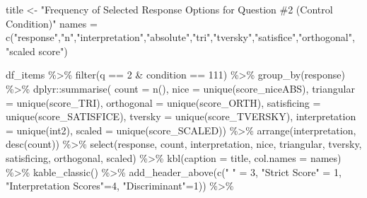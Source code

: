 \documentclass[
  letterpaper,
  DIV=11,
  numbers=noendperiod]{scrreprt}
\newenvironment{Shaded}{\begin{snugshade}}{\end{snugshade}}
\newcommand{\AttributeTok}[1]{\textcolor[rgb]{0.40,0.45,0.13}{#1}}
\newcommand{\DecValTok}[1]{\textcolor[rgb]{0.68,0.00,0.00}{#1}}
\newcommand{\FunctionTok}[1]{\textcolor[rgb]{0.28,0.35,0.67}{#1}}
\newcommand{\NormalTok}[1]{\textcolor[rgb]{0.00,0.23,0.31}{#1}}
\newcommand{\OtherTok}[1]{\textcolor[rgb]{0.00,0.23,0.31}{#1}}
\newcommand{\SpecialCharTok}[1]{\textcolor[rgb]{0.37,0.37,0.37}{#1}}
\newcommand{\StringTok}[1]{\textcolor[rgb]{0.13,0.47,0.30}{#1}}
\begin{document}
\begin{Shaded}
\begin{Highlighting}[]
\NormalTok{title }\OtherTok{\textless{}{-}} \StringTok{"Frequency of Selected Response Options for Question \#2 (Control Condition)"}
\NormalTok{names }\OtherTok{=} \FunctionTok{c}\NormalTok{(}\StringTok{"response"}\NormalTok{,}\StringTok{"n"}\NormalTok{,}\StringTok{"interpretation"}\NormalTok{,}\StringTok{"absolute"}\NormalTok{,}\StringTok{"tri"}\NormalTok{,}\StringTok{"tversky"}\NormalTok{,}\StringTok{"satisfice"}\NormalTok{,}\StringTok{"orthogonal"}\NormalTok{, }\StringTok{"scaled score"}\NormalTok{)}

\NormalTok{df\_items }\SpecialCharTok{\%\textgreater{}\%} \FunctionTok{filter}\NormalTok{(q }\SpecialCharTok{==} \DecValTok{2} \SpecialCharTok{\&}\NormalTok{ condition }\SpecialCharTok{==} \DecValTok{111}\NormalTok{) }\SpecialCharTok{\%\textgreater{}\%} \FunctionTok{group\_by}\NormalTok{(response) }\SpecialCharTok{\%\textgreater{}\%} 
\NormalTok{  dplyr}\SpecialCharTok{::}\FunctionTok{summarise}\NormalTok{( }\AttributeTok{count =} \FunctionTok{n}\NormalTok{(), }
                    \AttributeTok{nice =} \FunctionTok{unique}\NormalTok{(score\_niceABS),}
                    \AttributeTok{triangular =} \FunctionTok{unique}\NormalTok{(score\_TRI), }
                    \AttributeTok{orthogonal =}  \FunctionTok{unique}\NormalTok{(score\_ORTH),}
                    \AttributeTok{satisficing =}  \FunctionTok{unique}\NormalTok{(score\_SATISFICE),}
                    \AttributeTok{tversky =} \FunctionTok{unique}\NormalTok{(score\_TVERSKY),}
                    \AttributeTok{interpretation =} \FunctionTok{unique}\NormalTok{(int2),}
                    \AttributeTok{scaled =} \FunctionTok{unique}\NormalTok{(score\_SCALED)) }\SpecialCharTok{\%\textgreater{}\%} 
  \FunctionTok{arrange}\NormalTok{(interpretation, }\FunctionTok{desc}\NormalTok{(count)) }\SpecialCharTok{\%\textgreater{}\%} 
  \FunctionTok{select}\NormalTok{(response, count, interpretation, nice, }
\NormalTok{         triangular, tversky, satisficing, orthogonal, scaled) }\SpecialCharTok{\%\textgreater{}\%} 
  \FunctionTok{kbl}\NormalTok{(}\AttributeTok{caption =}\NormalTok{ title, }\AttributeTok{col.names =}\NormalTok{ names) }\SpecialCharTok{\%\textgreater{}\%}  \FunctionTok{kable\_classic}\NormalTok{() }\SpecialCharTok{\%\textgreater{}\%} 
  \FunctionTok{add\_header\_above}\NormalTok{(}\FunctionTok{c}\NormalTok{(}\StringTok{" "} \OtherTok{=} \DecValTok{3}\NormalTok{, }\StringTok{"Strict Score"} \OtherTok{=} \DecValTok{1}\NormalTok{, }\StringTok{"Interpretation Scores"}\OtherTok{=}\DecValTok{4}\NormalTok{, }\StringTok{"Discriminant"}\OtherTok{=}\DecValTok{1}\NormalTok{)) }\SpecialCharTok{\%\textgreater{}\%}

\end{Highlighting}
\end{Shaded}
\end{document}
